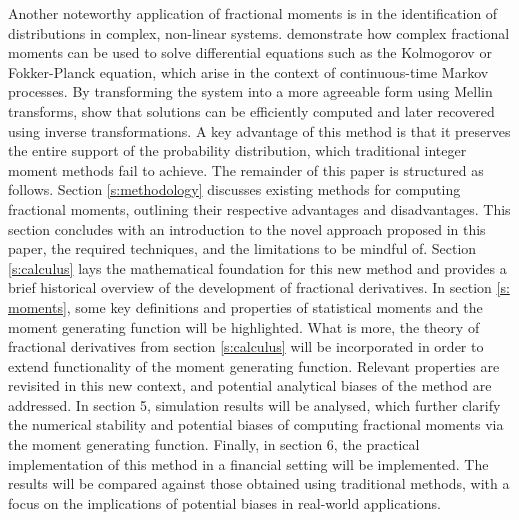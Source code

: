 \newline
Another noteworthy application of fractional moments is in the identification of distributions in complex, non-linear systems. \cite{dimatteo2014} demonstrate how complex fractional moments can be used to solve differential equations such as the Kolmogorov or Fokker-Planck equation, which arise in the context of continuous-time Markov processes.
By transforming the system into a more agreeable form using Mellin transforms, \cite{dimatteo2014} show that solutions can be efficiently computed and later recovered using inverse transformations. A key advantage of this method is that it preserves the entire support of the probability distribution, which traditional integer moment methods fail to achieve.
\newline
The remainder of this paper is structured as follows.
Section \ref{s:methodology} discusses existing methods for computing fractional moments, outlining their respective advantages and disadvantages. This section concludes with an introduction to the novel approach proposed in this paper, the required techniques, and the limitations to be mindful of. Section \ref{s:calculus} lays the mathematical foundation for this new method and provides a brief historical overview of the development of fractional derivatives. In section \ref{s: moments}, some key definitions and properties of statistical moments and the moment generating function will be highlighted. What is more, the theory of fractional derivatives from section \ref{s:calculus} will be incorporated in order to extend functionality of the moment generating function. Relevant properties are revisited in this new context, and potential analytical biases of the method are addressed. In section 5,  simulation results will be analysed, which further clarify the numerical stability and potential biases of computing fractional moments via the moment generating function. Finally, in section 6, the practical implementation of this method in a financial setting will be implemented. The results will be compared against those obtained using traditional methods, with a focus on the implications of potential biases in real-world applications.